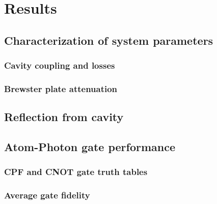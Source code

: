 \chapter{Results}

\section{Characterization of system parameters}
\subsection{Cavity coupling and losses}

\subsection{Brewster plate attenuation}

\section{Reflection from cavity}


\section{Atom-Photon gate performance}
\subsection{CPF and CNOT gate truth tables}
\subsection{Average gate fidelity}

